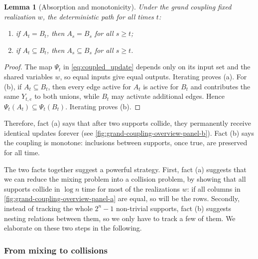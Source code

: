 \documentclass[
    aps,
    superscriptaddress,
    onecolumn,
    10pt,
    prx,
    nofootinbib
]{revtex4-2}
\newtheorem{lemma}{Lemma}
\theoremstyle{namedstatement}
\theoremstyle{plain}
\begin{document}
\begin{lemma}[Absorption and monotonicity]\label{lem:coupling_facts}
Under the grand coupling fixed realization $w$, the deterministic path for all times $t$:
\begin{enumerate}
    \item[(a)] if $A_t = B_t$, then $A_s = B_s$ for all $s \ge t$;
    \item[(b)] if $A_t \subseteq B_t$, then $A_s \subseteq B_s$ for all $s \ge t$.
\end{enumerate}
\end{lemma}
\begin{proof}
The map $\Psi_t$ in \cref{eq:coupled_update} depends only on its input set and the shared variables $w$, so equal inputs give equal outputs. Iterating proves (a). For (b), if $A_t \subseteq B_t$, then every edge active for $A_t$ is active for $B_t$ and contributes the same $Y_{t,e}$ to both unions, while $B_t$ may activate additional edges. Hence $\Psi_t(A_t) \subseteq \Psi_t(B_t)$. Iterating proves (b).
\end{proof}
Therefore, fact (a) says that after two supports collide, they permanently receive identical updates forever (see \cref{fig:grand-coupling-overview-panel-b}). Fact (b) says the coupling is monotone: inclusions between supports, once true, are preserved for all time.

The two facts together suggest a powerful strategy. First, fact (a) suggests that we can reduce the mixing problem into a collision problem, by showing that all supports collide in $\log n$ time for most of the realizations $w$: if all columns in \cref{fig:grand-coupling-overview-panel-a} are equal, so will be the rows. Secondly, instead of tracking the whole $2^n-1$ non-trivial supports, fact (b) suggests nesting relations between them, so we only have to track a few of them. We elaborate on these two steps in the following.

\newpage
\subsubsection{From mixing to collisions}
\end{document}
